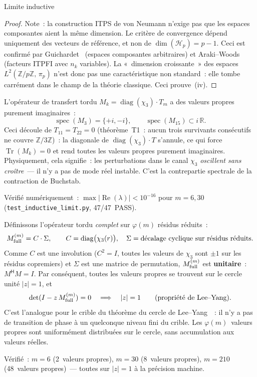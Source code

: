 \documentclass[12pt,a4paper]{article}
\begin{document}
\begin{thmbox}{Limite inductive}
\begin{proof}
Note~: la construction ITPS de von Neumann n'exige pas que les
espaces composantes aient la même dimension. Le critère de
convergence dépend uniquement des vecteurs de référence, et non
de $\dim(\mathcal{H}_p) = p - 1$. Ceci est confirmé par
Guichardet~\cite{Guichardet1966} (espaces composantes
arbitraires) et Araki--Woods~\cite{ArakiWoods1968} (facteurs ITPFI
avec $n_k$ variables). La «~dimension croissante~» des espaces
$L^2(\mathbb{Z}/p\mathbb{Z},\,\pi_p)$ n'est donc pas une
caractéristique non standard~: elle tombe carrément dans le champ
de la théorie classique. Ceci prouve~(iv).
\end{proof}
\end{thmbox}

\begin{remarque}\mBR
\label{rem:imag_spectrum}
L'opérateur de transfert tordu $M_k = \operatorname{diag}(\chi_3)
\cdot T_m$ a des valeurs propres purement imaginaires~:
\[
  \operatorname{spec}(M_3) = \{+i, -i\},
  \qquad
  \operatorname{spec}(M_{15}) \subset i\,\mathbb{R}.
\]
Ceci découle de $T_{11} = T_{22} = 0$ (théorème~T1~: aucun trois
survivants consécutifs ne couvre $\mathbb{Z}/3\mathbb{Z}$)~: la
diagonale de $\operatorname{diag}(\chi_3) \cdot T$ s'annule, ce
qui force $\operatorname{Tr}(M_k) = 0$ et rend toutes les valeurs
propres purement imaginaires. Physiquement, cela signifie~: les
perturbations dans le canal $\chi_3$ \emph{oscillent sans
croître}~--- il n'y a pas de mode réel instable. C'est la
contrepartie spectrale de la contraction de Buchstab.

Vérifié numériquement~: $\max|\operatorname{Re}(\lambda)| < 10^{-16}$
pour $m = 6, 30$ (\texttt{test\_inductive\_limit.py}, 47/47~PASS).
\end{remarque}

\begin{remarque}\mBR
\label{rem:lee_yang}
Définissons l'opérateur tordu \emph{complet} sur $\varphi(m)$
résidus réduits~:
\[
  M_{\rm full}^{(m)} = C \cdot \Sigma,
  \qquad
  C = \operatorname{diag}\bigl(\chi_3(r)\bigr),
  \quad
  \Sigma = \text{décalage cyclique sur résidus réduits}.
\]
Comme $C$ est une involution ($C^2 = I$, toutes les valeurs de
$\chi_3$ sont $\pm 1$ sur les résidus copremiers) et $\Sigma$ est
une matrice de permutation, $M_{\rm full}^{(m)}$ est
\textbf{unitaire}~: $M^{\mathsf{H}} M = I$. Par conséquent, toutes
les valeurs propres se trouvent sur le cercle unité $|z| = 1$, et
\[
  \det(I - z\,M_{\rm full}^{(m)}) = 0
  \quad \Longrightarrow \quad |z| = 1
  \qquad \text{(propriété de Lee--Yang)}.
\]
C'est l'analogue pour le crible du théorème du cercle de
Lee--Yang~\cite{LeeYang1952}~: il n'y a pas de transition de phase
à un quelconque niveau fini du crible. Les $\varphi(m)$~valeurs
propres sont uniformément distribuées sur le cercle, sans
accumulation aux valeurs réelles.

Vérifié~: $m = 6$ (2~valeurs propres), $m = 30$ (8~valeurs
propres), $m = 210$ (48~valeurs propres)~--- toutes sur $|z| = 1$
à la précision machine.
\end{remarque}
\end{document}
